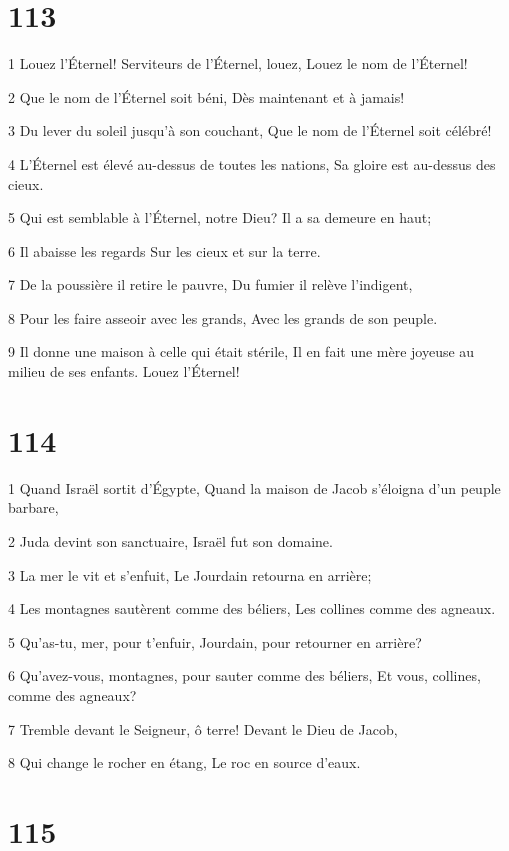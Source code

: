 \chapter{113}

\par 1 Louez l'Éternel! Serviteurs de l'Éternel, louez, Louez le nom de l'Éternel!
\par 2 Que le nom de l'Éternel soit béni, Dès maintenant et à jamais!
\par 3 Du lever du soleil jusqu'à son couchant, Que le nom de l'Éternel soit célébré!
\par 4 L'Éternel est élevé au-dessus de toutes les nations, Sa gloire est au-dessus des cieux.
\par 5 Qui est semblable à l'Éternel, notre Dieu? Il a sa demeure en haut;
\par 6 Il abaisse les regards Sur les cieux et sur la terre.
\par 7 De la poussière il retire le pauvre, Du fumier il relève l'indigent,
\par 8 Pour les faire asseoir avec les grands, Avec les grands de son peuple.
\par 9 Il donne une maison à celle qui était stérile, Il en fait une mère joyeuse au milieu de ses enfants. Louez l'Éternel!

\chapter{114}

\par 1 Quand Israël sortit d'Égypte, Quand la maison de Jacob s'éloigna d'un peuple barbare,
\par 2 Juda devint son sanctuaire, Israël fut son domaine.
\par 3 La mer le vit et s'enfuit, Le Jourdain retourna en arrière;
\par 4 Les montagnes sautèrent comme des béliers, Les collines comme des agneaux.
\par 5 Qu'as-tu, mer, pour t'enfuir, Jourdain, pour retourner en arrière?
\par 6 Qu'avez-vous, montagnes, pour sauter comme des béliers, Et vous, collines, comme des agneaux?
\par 7 Tremble devant le Seigneur, ô terre! Devant le Dieu de Jacob,
\par 8 Qui change le rocher en étang, Le roc en source d'eaux.

\chapter{115}


